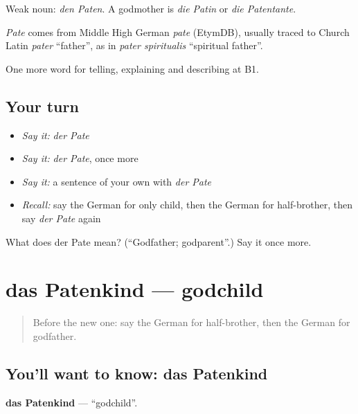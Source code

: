 Weak noun: \emph{den Paten}. A godmother is \emph{die Patin} or \emph{die Patentante}.

\begin{cousinweb}
\emph{Pate} comes from Middle High German \emph{pate} (EtymDB), usually traced to Church Latin \emph{pater} \textquotedblleft{}father\textquotedblright{}, as in \emph{pater spiritualis} \textquotedblleft{}spiritual father\textquotedblright{}.
\end{cousinweb}

\begin{grammarlens}[title={What you've built}]
One more word for telling, explaining and describing at B1.
\end{grammarlens}

\subsection*{Your turn}
\begin{itemize}
\raggedright
  \item \emph{Say it:} \emph{der Pate}
  \item \emph{Say it:} \emph{der Pate}, once more
  \item \emph{Say it:} a sentence of your own with \emph{der Pate}
  \item \emph{Recall:} say the German for only child, then the German for half-brother, then say \emph{der Pate} again
\end{itemize}

\begin{tcolorbox}[breakable,colback=teal!4,colframe=teal!35!black,title={Before you move on}]
What does der Pate mean? (\textquotedblleft{}Godfather; godparent\textquotedblright{}.) Say it once more.
\end{tcolorbox}
\section[das Patenkind]{das Patenkind — godchild}

\label{lesson:GE-C491-patenkind}



\begin{quote}
Before the new one: say the German for half-brother, then the German for godfather.
\end{quote}

\subsection*{You'll want to know: das Patenkind}
\textbf{das Patenkind} — \textquotedblleft{}godchild\textquotedblright{}.

